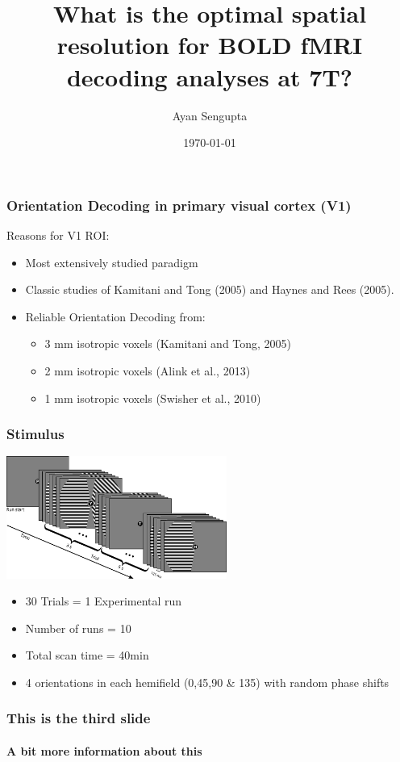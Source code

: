 \documentclass{beamer}
\title{What is the optimal spatial resolution for BOLD fMRI decoding analyses at 7T?}
\author{Ayan Sengupta\inst{1}}
\institute[Affiliations] %
{
  \inst{1}%
  Institute of Experimental Psychology\\
  Otto-von-Guericke University\\
  Magdeburg
}
\date{\today}
\begin{document}
\frame{\titlepage}
  \begin{frame}
    \frametitle{Orientation Decoding in primary visual cortex (V1)}
    Reasons for V1 ROI:
    \begin{itemize}
        \item Most extensively studied paradigm
        \item Classic studies of Kamitani and Tong (2005) and Haynes and Rees (2005).
        \item Reliable Orientation Decoding from:
            \begin{itemize}
                \item 3 mm isotropic voxels (Kamitani and Tong, 2005)
                \item 2 mm isotropic voxels (Alink et al., 2013)
                \item 1 mm isotropic voxels (Swisher et al., 2010)
            \end{itemize}
    \end{itemize}
  \end{frame}
    \begin{frame}
        \frametitle{Stimulus}
            \begin{center}
                \includegraphics[height=4cm]{pics/stimulus}
            \end{center}
            \begin{itemize}
                \item 30 Trials = 1 Experimental run
                \item Number of runs = 10
                \item Total scan time = 40min
                \item 4 orientations in each hemifield (0,45,90 \& 135) with random phase shifts
            \end{itemize}

    \end{frame}
 
  \begin{frame}
    \frametitle{This is the third slide}
    \framesubtitle{A bit more information about this}
  \end{frame}
\end{document}
